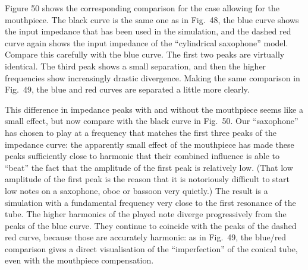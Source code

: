 
  Figure 50 shows the corresponding comparison for the case allowing for the 
  mouthpiece. The black curve is the same one as in Fig.\ 48, the blue curve 
  shows the input impedance that has been used in the simulation, and the 
  dashed red curve again shows the input impedance of the “cylindrical 
  saxophone” model. Compare this carefully with the blue curve. The first two 
  peaks are virtually identical. The third peak shows a small separation, and 
  then the higher frequencies show increasingly drastic divergence. Making the 
  same comparison in Fig.\ 49, the blue and red curves are separated a little 
  more clearly. 


  This difference in impedance peaks with and without the mouthpiece seems like 
  a small effect, but now compare with the black curve in Fig.\ 50. Our 
  “saxophone” has chosen to play at a frequency that matches the first three 
  peaks of the impedance curve: the apparently small effect of the mouthpiece 
  has made these peaks sufficiently close to harmonic that their combined 
  influence is able to ``beat'' the fact that the amplitude of the first peak 
  is relatively low. (That low amplitude of the first peak is the reason that 
  it is notoriously difficult to start low notes on a saxophone, oboe or 
  bassoon very quietly.) The result is a simulation with a fundamental 
  frequency very close to the first resonance of the tube. The higher harmonics 
  of the played note diverge progressively from the peaks of the blue curve. 
  They continue to coincide with the peaks of the dashed red curve, because 
  those are accurately harmonic: as in Fig.\ 49, the blue/red comparison gives 
  a direct visualisation of the “imperfection” of the conical tube, even with 
  the mouthpiece compensation. 



